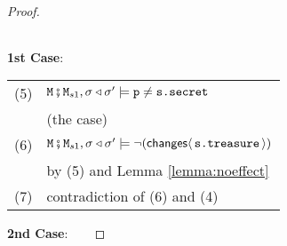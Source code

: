 \documentclass[acmsmall,screen,anonymous,review]{acmart}
\newcommand{\SPACE}{\hspace{1.5in}}
\begin{document}
\begin{proof}
\begin{tabular}{ll}
\end{tabular}

\textbf{1st Case}: \\

\begin{tabular}{ll}
(5) & ${\mbox{\tt{\ensuremath{{\mbox{\tt{M}}}}}}}\fatsemi {\mbox{\tt{\ensuremath{{\mbox{\tt{M}}}}}}}_{s1}, \sigma\triangleleft \sigma' \models  {\mbox{\tt{p}}}\neq{\mbox{\tt{s.secret}}}$\\
& \SPACE (the case)
\\
(6) & $  {\mbox{\tt{\ensuremath{{\mbox{\tt{M}}}}}}}\fatsemi {\mbox{\tt{\ensuremath{{\mbox{\tt{M}}}}}}}_{s1}, \sigma\triangleleft \sigma' \models    \neg({\mathsf{changes}}\langle\,{\mbox{\tt{s.treasure}}} \,\rangle)  $ \\
& \SPACE by  (5) and Lemma \ref{lemma:noeffect}  
\\
(7) &   contradiction of (6) and (4)
\end{tabular}

\textbf{2nd Case}: ~ ~


\end{proof}
\end{document}
